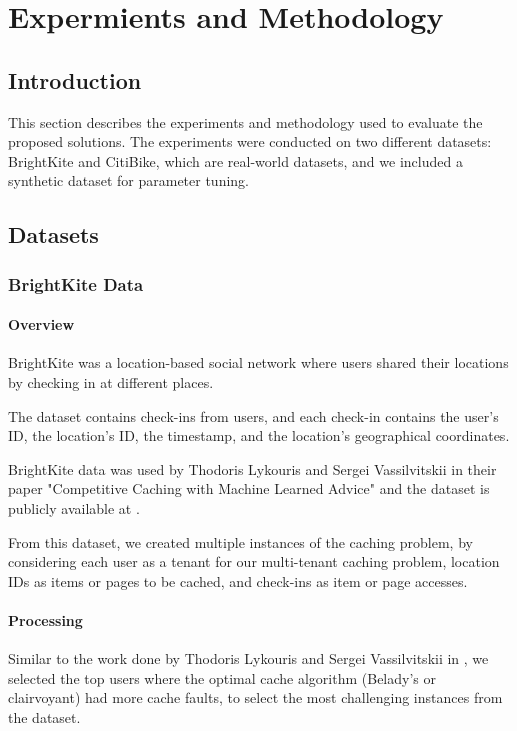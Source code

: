 \chapter{Expermients and Methodology}

\section{Introduction}

This section describes the experiments and methodology used to evaluate the proposed solutions. 
The experiments were conducted on two different datasets: BrightKite and CitiBike, which are 
real-world datasets, and we included a synthetic dataset for parameter tuning.

\section{Datasets}

\subsection{BrightKite Data}

\subsubsection{Overview}

BrightKite was a location-based social network where users shared their locations by checking in at 
different places.

The dataset contains check-ins from users, and each check-in contains the user's ID, the location's ID, 
the timestamp, and the location's geographical coordinates.

BrightKite data was used by Thodoris Lykouris and Sergei Vassilvitskii in their paper "Competitive 
Caching with Machine Learned Advice" \cite{datasets-reference} and the dataset is publicly available
at \cite{brightkite-data}.

From this dataset, we created multiple instances of the caching problem, by considering each user 
as a tenant for our multi-tenant caching problem, location IDs as items or pages to be cached, and 
check-ins as item or page accesses. 

\subsubsection{Processing}

Similar to the work done by Thodoris Lykouris and Sergei Vassilvitskii in \cite{datasets-reference},
we selected the top users where the optimal cache algorithm (Belady's or clairvoyant) had more cache 
faults, to select the most challenging instances from the dataset.


